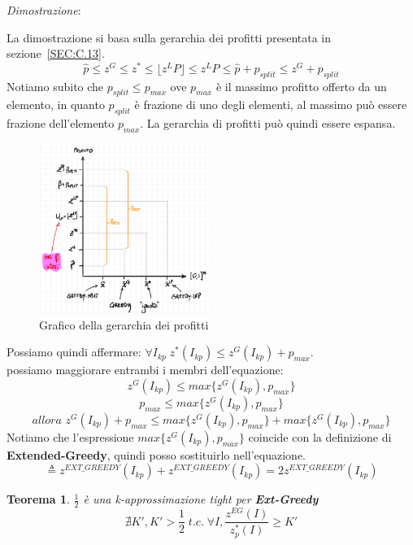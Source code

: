 \documentclass[a4paper]{article}
\newtheorem*{theorem}{Teorema}
\newenvironment{dimostrazione}{\textit{Dimostrazione}:\begin{adjustwidth}{1cm}{}}{\end{adjustwidth}}
\begin{document}
\begin{dimostrazione}
	La dimostrazione si basa sulla gerarchia dei profitti presentata in sezione~\ref{SEC:C.13}.\\
	$$\hat p \leq z^G \leq z^* \leq \lfloor z^LP \rfloor  \leq z^LP \leq \hat p + p_{split} \leq z^G + p_{split}$$
	Notiamo subito che $p_{split} \leq p_{max}$ ove $p_{max}$ è il massimo profitto offerto da un elemento, in quanto $p_{split}$ è frazione di uno degli elementi, al massimo può essere frazione dell'elemento $p_{max}$.
	La gerarchia di profitti può quindi essere espansa.\\
\begin{figure}[!ht]
\centering
\includegraphics[width=0.5\textwidth]{./img/C_13.png}
\caption{Grafico della gerarchia dei profitti} \label{FIG:C_13_2}
\end{figure}
Possiamo quindi affermare:
$\forall I_{kp} \; z^*(I_{kp}) \leq z^G(I_{kp}) + p_{max}$.\\
possiamo maggiorare entrambi i membri dell'equazione:
$$z^G(I_{kp}) \leq max\{z^G(I_{kp}), p_{max}\}$$
$$p_{max} \leq max\{z^G(I_{kp}), p_{max}\}$$
$$ \textit{allora } z^G(I_{kp}) + p_{max} \leq max\{z^G(I_{kp}), p_{max}\} + max\{z^G(I_{kp}), p_{max}\}$$
Notiamo che l'espressione $max\{z^G(I_{kp}), p_{max}\}$ coincide con la definizione di \textbf{Extended-Greedy}, quindi posso sostituirlo nell'equazione.
$$\triangleq z^{EXT\_GREEDY}(I_{kp}) + z^{EXT\_GREEDY}(I_{kp}) = 2z^{EXT\_GREEDY}(I_{kp}) $$

\end{dimostrazione}
\begin{theorem} $\frac{1}{2}$ è una k-approssimazione tight per \textbf{Ext-Greedy}
	$$\nexists K', K' > \frac{1}{2} \; t.c. \; \forall I, \frac{z^{EG}(I)}{z^*_p(I)} \geq K'$$
\end{theorem}
\end{document}
